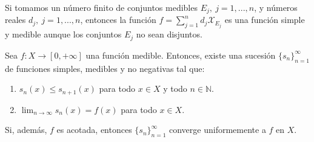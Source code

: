 \begin{obs}
    Si tomamos un número finito de conjuntos medibles $E_j, \ j = 1,...,n$, y números reales $d_j, \ j = 1,...,n$, entonces la función $f = \sum_{j = 1}^{n}{d_j \mathcal{X}_{E_j}}$ es una función simple y medible aunque los conjuntos $E_j$ no sean disjuntos.
\end{obs}
\begin{teo}
    Sea $f: X \longrightarrow [0, +\infty]$ una función medible. Entonces, existe una sucesión $\{ s_n\}_{n=1}^{\infty}$ de funciones simples, medibles y no negativas tal que:
    \begin{enumerate}
        \item $s_n(x) \leq s_{n+1}(x)$ para todo $x \in X$ y todo $n \in \mathbb{N}$.
        \item $\lim_{n \to \infty}{s_n(x)} = f(x)$ para todo $x \in X$.
    \end{enumerate}
    Si, además, $f$ es acotada, entonces $\{ s_n\}_{n=1}^{\infty}$ converge uniformemente a $f$ en $X$.
\end{teo}
